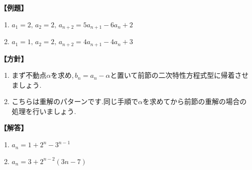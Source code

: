 \noindent \textbf{【例題】}
\begin{enumerate}[label=(\arabic*),parsep=3pt]
  \item $\displaystyle a_1=2,\,a_2=2,\, a_{n+2}=5a_{n+1}-6a_n+2$
  \item $\displaystyle a_1=1,\,a_2=2,\, a_{n+2}=4a_{n+1}-4a_n+3$
\end{enumerate}

\noindent\textbf{【方針】}
\begin{enumerate}[label=(\arabic*),parsep=3pt]
  \item まず不動点$\alpha$を求め,\,$b_n=a_n-\alpha$と置いて前節の二次特性方程式型に帰着させましょう.
  \item こちらは重解のパターンです.同じ手順で$\alpha$を求めてから前節の重解の場合の処理を行いましょう.
\end{enumerate}

\noindent\textbf{【解答】}
\begin{enumerate}[label=(\arabic*),parsep=3pt]
  \item $\displaystyle a_n=1+2^n-3^{n-1}$
  \item $\displaystyle a_n=3+2^{n-2}(3n-7)$
\end{enumerate}

